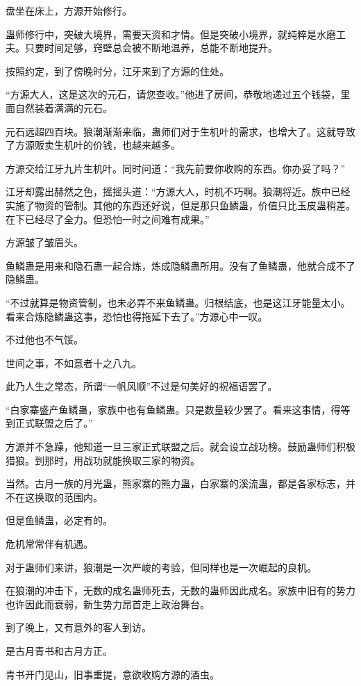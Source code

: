 \begin{this_body}
盘坐在床上，方源开始修行。

蛊师修行中，突破大境界，需要天资和才情。但是突破小境界，就纯粹是水磨工夫。只要时间足够，窍壁总会被不断地温养，总能不断地提升。

按照约定，到了傍晚时分，江牙来到了方源的住处。

“方源大人，这是这次的元石，请您查收。”他进了房间，恭敬地递过五个钱袋，里面自然装着满满的元石。

元石远超四百块。狼潮渐渐来临，蛊师们对于生机叶的需求，也增大了。这就导致了方源贩卖生机叶的价钱，也越来越多。

方源交给江牙九片生机叶。同时问道：“我先前要你收购的东西。你办妥了吗？”

江牙却露出赫然之色，摇摇头道：“方源大人，时机不巧啊。狼潮将近。族中已经实施了物资的管制。其他的东西还好说，但是那只鱼鳞蛊，价值只比玉皮蛊稍差。在下已经尽了全力。但恐怕一时之间难有成果。”

方源皱了皱眉头。

鱼鳞蛊是用来和隐石蛊一起合炼，炼成隐鳞蛊所用。没有了鱼鳞蛊，他就合成不了隐鳞蛊。

“不过就算是物资管制，也未必弄不来鱼鳞蛊。归根结底，也是这江牙能量太小。看来合炼隐鳞蛊这事，恐怕也得拖延下去了。”方源心中一叹。

不过他也不气馁。

世间之事，不如意者十之八九。

此乃人生之常态，所谓“一帆风顺”不过是句美好的祝福语罢了。

“白家寨盛产鱼鳞蛊，家族中也有鱼鳞蛊。只是数量较少罢了。看来这事情，得等到正式联盟之后了。”

方源并不急躁，他知道一旦三家正式联盟之后。就会设立战功榜。鼓励蛊师们积极猎狼。到那时，用战功就能换取三家的物资。

当然。古月一族的月光蛊，熊家寨的熊力蛊，白家寨的溪流蛊，都是各家标志，并不在这换取的范围内。

但是鱼鳞蛊，必定有的。

危机常常伴有机遇。

对于蛊师们来讲，狼潮是一次严峻的考验，但同样也是一次崛起的良机。

在狼潮的冲击下，无数的成名蛊师死去，无数的蛊师因此成名。家族中旧有的势力也许因此而衰弱，新生势力昂首走上政治舞台。

到了晚上，又有意外的客人到访。

是古月青书和古月方正。

青书开门见山，旧事重提，意欲收购方源的酒虫。


\end{this_body}
